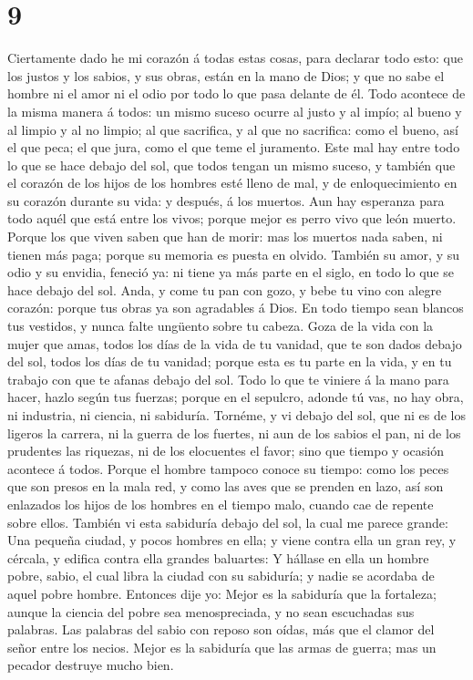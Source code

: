 \hypertarget{section-8}{%
\section{9}\label{section-8}}

 Ciertamente dado he mi corazón á todas estas cosas, para
declarar todo esto: que los justos y los sabios, y sus obras, están en
la mano de Dios; y que no sabe el hombre ni el amor ni el odio por todo
lo que pasa delante de él.  Todo acontece de la misma manera
á todos: un mismo suceso ocurre al justo y al impío; al bueno y al
limpio y al no limpio; al que sacrifica, y al que no sacrifica: como el
bueno, así el que peca; el que jura, como el que teme el juramento.
 Este mal hay entre todo lo que se hace debajo del sol, que
todos tengan un mismo suceso, y también que el corazón de los hijos de
los hombres esté lleno de mal, y de enloquecimiento en su corazón
durante su vida: y después, á los muertos.  Aun hay
esperanza para todo aquél que está entre los vivos; porque mejor es
perro vivo que león muerto.  Porque los que viven saben que
han de morir: mas los muertos nada saben, ni tienen más paga; porque su
memoria es puesta en olvido.  También su amor, y su odio y
su envidia, feneció ya: ni tiene ya más parte en el siglo, en todo lo
que se hace debajo del sol.  Anda, y come tu pan con gozo, y
bebe tu vino con alegre corazón: porque tus obras ya son agradables á
Dios.  En todo tiempo sean blancos tus vestidos, y nunca
falte ungüento sobre tu cabeza.  Goza de la vida con la
mujer que amas, todos los días de la vida de tu vanidad, que te son
dados debajo del sol, todos los días de tu vanidad; porque esta es tu
parte en la vida, y en tu trabajo con que te afanas debajo del sol.
 Todo lo que te viniere á la mano para hacer, hazlo según
tus fuerzas; porque en el sepulcro, adonde tú vas, no hay obra, ni
industria, ni ciencia, ni sabiduría.  Tornéme, y vi debajo
del sol, que ni es de los ligeros la carrera, ni la guerra de los
fuertes, ni aun de los sabios el pan, ni de los prudentes las riquezas,
ni de los elocuentes el favor; sino que tiempo y ocasión acontece á
todos.  Porque el hombre tampoco conoce su tiempo: como los
peces que son presos en la mala red, y como las aves que se prenden en
lazo, así son enlazados los hijos de los hombres en el tiempo malo,
cuando cae de repente sobre ellos.  También vi esta
sabiduría debajo del sol, la cual me parece grande:  Una
pequeña ciudad, y pocos hombres en ella; y viene contra ella un gran
rey, y cércala, y edifica contra ella grandes baluartes:  Y
hállase en ella un hombre pobre, sabio, el cual libra la ciudad con su
sabiduría; y nadie se acordaba de aquel pobre hombre. 
Entonces dije yo: Mejor es la sabiduría que la fortaleza; aunque la
ciencia del pobre sea menospreciada, y no sean escuchadas sus palabras.
 Las palabras del sabio con reposo son oídas, más que el
clamor del señor entre los necios.  Mejor es la sabiduría
que las armas de guerra; mas un pecador destruye mucho bien.

